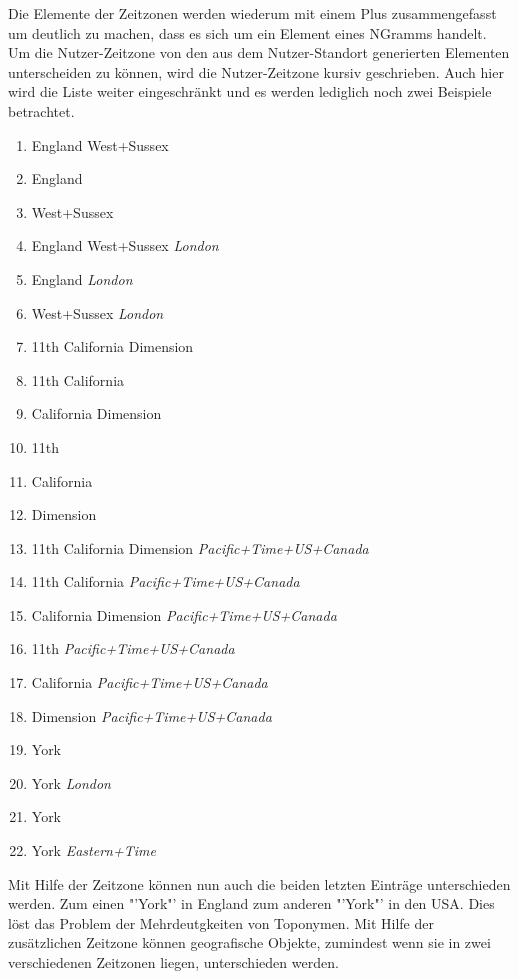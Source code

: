 					Die Elemente der Zeitzonen werden wiederum mit einem Plus zusammengefasst um deutlich zu machen, dass es sich um ein Element eines NGramms handelt.
					Um die Nutzer-Zeitzone von den aus dem Nutzer-Standort generierten Elementen unterscheiden zu können, wird die Nutzer-Zeitzone kursiv geschrieben.
					Auch hier wird die Liste weiter eingeschränkt und es werden lediglich noch zwei Beispiele betrachtet.
					\begin{multicols}{2}
						\begin{enumerate}
							\item England West+Sussex
							\item  England  
							\item  West+Sussex  
							\item  England    West+Sussex   \textit{London}
							\item  England   \textit{London}
							\item  West+Sussex   \textit{London}
							\item  11th    California    Dimension    
							\item  11th    California  
							\item  California    Dimension   
							\item  11th  
							\item  California  
							\item  Dimension   
							\item  11th  California    Dimension   \textit{Pacific+Time+US+Canada}
							\item  11th    California   \textit{Pacific+Time+US+Canada}
							\item  California    Dimension   \textit{Pacific+Time+US+Canada}
							\item  11th   \textit{Pacific+Time+US+Canada}
							\item  California   \textit{Pacific+Time+US+Canada}
							\item  Dimension   \textit{Pacific+Time+US+Canada}
							\item York
							\item  York   \textit{London}
							\item York
							\item  York   \textit{Eastern+Time}
						\end{enumerate}	
					\end{multicols}
					Mit Hilfe der Zeitzone können nun auch die beiden letzten Einträge unterschieden werden. 
					Zum einen "'York"' in England zum anderen "'York"' in den USA. 
					Dies löst das Problem der Mehrdeutgkeiten von Toponymen. 
					Mit Hilfe der zusätzlichen Zeitzone können geografische Objekte, zumindest wenn sie in zwei verschiedenen Zeitzonen liegen, unterschieden werden.

